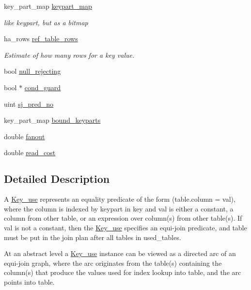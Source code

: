 \begin{DoxyCompactItemize}
key\+\_\+part\+\_\+map \mbox{\hyperlink{classKey__use_a519f9f72bfdf036c9476ed0d3f624c4a}{keypart\+\_\+map}}
\begin{DoxyCompactList}\small\item\em like keypart, but as a bitmap \end{DoxyCompactList}\item 
\mbox{\label{classKey__use_a6aab1a96e0a25cd25ab6c482efd6de9a}} 
ha\+\_\+rows \mbox{\hyperlink{classKey__use_a6aab1a96e0a25cd25ab6c482efd6de9a}{ref\+\_\+table\+\_\+rows}}
\begin{DoxyCompactList}\small\item\em Estimate of how many rows for a key value. \end{DoxyCompactList}\item 
bool \mbox{\hyperlink{classKey__use_acba461fa75819da0303af030700a8d5b}{null\+\_\+rejecting}}
\item 
bool $\ast$ \mbox{\hyperlink{classKey__use_ae462d9f6aefe49c1907600a9921b02a6}{cond\+\_\+guard}}
\item 
uint \mbox{\hyperlink{classKey__use_a72971098712c22d6ab436e02a66837d4}{sj\+\_\+pred\+\_\+no}}
\item 
key\+\_\+part\+\_\+map \mbox{\hyperlink{classKey__use_a0559be6fdc6c44e75d911049c2d61d0d}{bound\+\_\+keyparts}}
\item 
double \mbox{\hyperlink{classKey__use_aff1bd83706433a6e2ea488815989a951}{fanout}}
\item 
double \mbox{\hyperlink{classKey__use_a48b5e41c710a57dd77c0da56d1666e8c}{read\+\_\+cost}}
\end{DoxyCompactItemize}


\subsection{Detailed Description}
A \mbox{\hyperlink{classKey__use}{Key\+\_\+use}} represents an equality predicate of the form (table.\+column = val), where the column is indexed by {\ttfamily keypart} in {\ttfamily key} and {\ttfamily val} is either a constant, a column from other table, or an expression over column(s) from other table(s). If {\ttfamily val} is not a constant, then the \mbox{\hyperlink{classKey__use}{Key\+\_\+use}} specifies an equi-\/join predicate, and {\ttfamily table} must be put in the join plan after all tables in {\ttfamily used\+\_\+tables}.

At an abstract level a \mbox{\hyperlink{classKey__use}{Key\+\_\+use}} instance can be viewed as a directed arc of an equi-\/join graph, where the arc originates from the table(s) containing the column(s) that produce the values used for index lookup into {\ttfamily table}, and the arc points into {\ttfamily table}.

